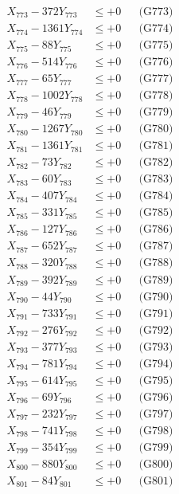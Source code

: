 \documentclass[a4paper,10pt]{article}
\begin{document}
{\begin{align}
X_{773} - 372Y_{773} &\leq +0 && \text{(G773)} \\
X_{774} - 1361Y_{774} &\leq +0 && \text{(G774)} \\
X_{775} - 88Y_{775} &\leq +0 && \text{(G775)} \\
X_{776} - 514Y_{776} &\leq +0 && \text{(G776)} \\
X_{777} - 65Y_{777} &\leq +0 && \text{(G777)} \\
X_{778} - 1002Y_{778} &\leq +0 && \text{(G778)} \\
X_{779} - 46Y_{779} &\leq +0 && \text{(G779)} \\
X_{780} - 1267Y_{780} &\leq +0 && \text{(G780)} \\
\allowbreak
X_{781} - 1361Y_{781} &\leq +0 && \text{(G781)} \\
X_{782} - 73Y_{782} &\leq +0 && \text{(G782)} \\
X_{783} - 60Y_{783} &\leq +0 && \text{(G783)} \\
X_{784} - 407Y_{784} &\leq +0 && \text{(G784)} \\
X_{785} - 331Y_{785} &\leq +0 && \text{(G785)} \\
X_{786} - 127Y_{786} &\leq +0 && \text{(G786)} \\
X_{787} - 652Y_{787} &\leq +0 && \text{(G787)} \\
X_{788} - 320Y_{788} &\leq +0 && \text{(G788)} \\
X_{789} - 392Y_{789} &\leq +0 && \text{(G789)} \\
X_{790} - 44Y_{790} &\leq +0 && \text{(G790)} \\
\allowbreak
X_{791} - 733Y_{791} &\leq +0 && \text{(G791)} \\
X_{792} - 276Y_{792} &\leq +0 && \text{(G792)} \\
X_{793} - 377Y_{793} &\leq +0 && \text{(G793)} \\
X_{794} - 781Y_{794} &\leq +0 && \text{(G794)} \\
X_{795} - 614Y_{795} &\leq +0 && \text{(G795)} \\
X_{796} - 69Y_{796} &\leq +0 && \text{(G796)} \\
X_{797} - 232Y_{797} &\leq +0 && \text{(G797)} \\
X_{798} - 741Y_{798} &\leq +0 && \text{(G798)} \\
X_{799} - 354Y_{799} &\leq +0 && \text{(G799)} \\
X_{800} - 880Y_{800} &\leq +0 && \text{(G800)} \\
\allowbreak
X_{801} - 84Y_{801} &\leq +0 && \text{(G801)} \\

\end{align}}
\end{document}
